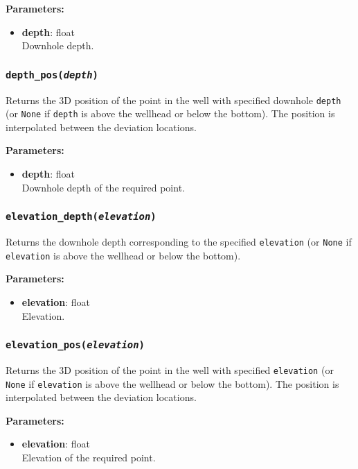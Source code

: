 \textbf{Parameters:}
\begin{itemize}
\item \textbf{depth}: float\\
  Downhole depth.
\end{itemize}

\subsubsection{\texttt{depth\_pos(\emph{depth})}}

Returns the 3D position of the point in the well with specified downhole \texttt{depth} (or \texttt{None} if \texttt{depth} is above the wellhead or below the bottom).  The position is interpolated between the deviation locations.

\textbf{Parameters:}
\begin{itemize}
\item \textbf{depth}: float\\
  Downhole depth of the required point.
\end{itemize}

\subsubsection{\texttt{elevation\_depth(\emph{elevation})}}

Returns the downhole depth corresponding to the specified \texttt{elevation} (or \texttt{None} if \texttt{elevation} is above the wellhead or below the bottom).

\textbf{Parameters:}
\begin{itemize}
\item \textbf{elevation}: float\\
  Elevation.
\end{itemize}

\subsubsection{\texttt{elevation\_pos(\emph{elevation})}}

Returns the 3D position of the point in the well with specified \texttt{elevation} (or \texttt{None} if \texttt{elevation} is above the wellhead or below the bottom).  The position is interpolated between the deviation locations.

\textbf{Parameters:}
\begin{itemize}
\item \textbf{elevation}: float\\
  Elevation of the required point.
\end{itemize}

